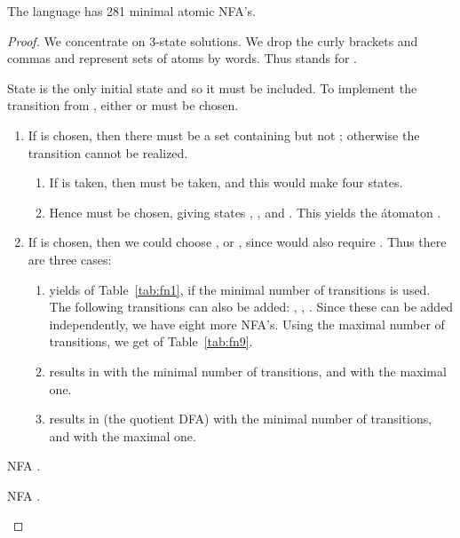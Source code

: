 \documentclass{llncs}
\newcommand{\be}{\begin{enumerate}}
\newcommand{\ee}{\end{enumerate}}
\begin{document}
\begin{example}
\begin{table}[hbt]
\begin{minipage}[b]{0.45\linewidth}
\begin{center}
\end{center}
\end{minipage}
\end{table}

\begin{proposition} 
\label{prop:281}
The language  has 281 minimal atomic NFA's. 
\end{proposition}
\begin{proof}
We concentrate on 3-state solutions. 
We drop the curly brackets and commas and represent sets of atoms by words. Thus  stands for 
.

State  is the only initial state and so it must be included.
To implement the transition
 from ,
either  or  must be chosen. 
\be
\item
If  is chosen, then there must be a set containing  but not ; otherwise 
the transition 
  cannot be realized.
        \be
        \item
        If  is taken, then  must be taken, and this would make four states.
        \item
         Hence  must be chosen, giving states , , and .
         This yields the \'atomaton .
         \ee
\item
If  is chosen, then we could choose ,  or , since  would also require
 . Thus there are three cases:
        \be
        \item
         yields  of Table~\ref{tab:fn1}, if the minimal number of 
        transitions is used. 
        The following transitions can also be added: , , .
        Since these can be added independently, we have eight more NFA's. 
        Using the maximal number of transitions, we get  of Table~\ref{tab:fn9}.
        \item
         results in  with the minimal number of transitions, and 
         with the maximal one.
        \item
         results in  (the quotient DFA) with the minimal number 
of transitions, and   with the maximal one.
        \ee
\ee


\begin{table}[hbt]
\begin{minipage}[b]{0.45\linewidth}
\caption{NFA .}
\label{tab:fn10}
\begin{center}

\end{center}
\end{minipage}
\hspace{0.2cm}
\begin{minipage}[b]{0.45\linewidth}
\caption{NFA .}
\label{tab:fn25}
\begin{center}


\end{center}
\end{minipage}
\end{table}
\end{proof}
\end{example}
\end{document}
